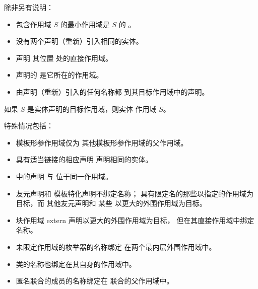 \pnum
除非另有说明：
\begin{itemize}
\item
包含作用域 $S$ 的最小作用域是 $S$ 的 。
\item
没有两个声明（重新）引入相同的实体。
\item
声明  其位置 处的直接作用域。
\item
声明的  是它所在的作用域。
\item
由声明（重新）引入的任何名称都  到其目标作用域中的声明。
\end{itemize}
如果 $S$ 是实体声明的目标作用域，则实体  作用域 $S$。
\begin{note}
特殊情况包括：
\begin{itemize}
\item
模板形参作用域仅为
其他模板形参作用域的父作用域。
\item
具有适当链接的相应声明
声明相同的实体。
\item
{} 中的声明
与  位于同一作用域。
\item
友元声明和
模板特化声明不绑定名称；
具有限定名的那些以指定的作用域为目标，而
其他友元声明和
某些 
 以更大的外围作用域为目标。
\item
块作用域 extern 声明以更大的外围作用域为目标，
但在其直接作用域中绑定名称。
\item
未限定作用域的枚举器的名称绑定
在两个最内层外围作用域中。
\item
类的名称也绑定在其自身的作用域中。
\item
匿名联合的成员的名称绑定在
联合的父作用域中。
\end{itemize}
\end{note}

